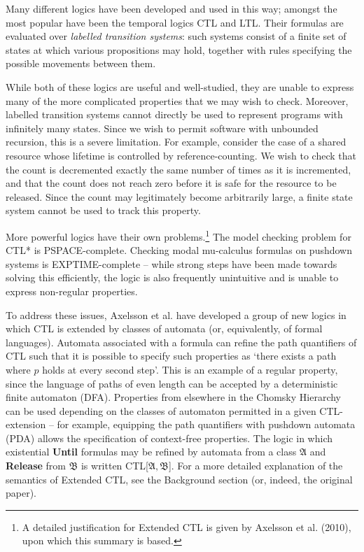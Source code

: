 \documentclass[11pt]{article}
\theoremstyle{definition}
\begin{document}
Many different logics have been developed and used in this way; amongst the
most popular have been the temporal logics CTL and LTL. Their formulas are
evaluated over \textit{labelled transition systems}: such systems consist of a
finite set of states at which various propositions may hold, together with
rules specifying the possible movements between them.

While both of these logics are useful and well-studied, they are unable to
express many of the more complicated properties that we may wish to check.
Moreover, labelled transition systems cannot directly be used to represent
programs with infinitely many states. Since we wish to permit software with
unbounded recursion, this is a severe limitation. For example, consider the
case of a shared resource whose lifetime is controlled by reference-counting.
We wish to check that the count is decremented exactly the same number of times
as it is incremented, and that the count does not reach zero before it is safe
for the resource to be released. Since the count may legitimately become
arbitrarily large, a finite state system cannot be used to track this property.


More powerful logics have their own problems.\footnote{A detailed justification
for Extended CTL is given by Axelsson et al. (2010), upon which this summary is
based.} The model checking problem for CTL* is
PSPACE-complete\cite{Kreutzer10}\cite{sistla1985complexity}.  Checking modal
mu-calculus formulas on pushdown systems is
EXPTIME-complete\cite{walukiewicz1996pushdown} -- while strong steps have been
made towards solving this efficiently\cite{hague2010analysing}, the logic is
also frequently unintuitive and is unable to express non-regular properties.

To address these issues, Axelsson et al. have developed a group of new logics
in which CTL is extended by classes of automata (or, equivalently, of formal
languages).\cite{Kreutzer10} Automata associated with a formula can refine the path quantifiers
of CTL such that it is possible to specify such properties as `there exists a
path where $p$ holds at every second step'. This is an example of a regular
property, since the language of paths of even length can be accepted by a
deterministic finite automaton (DFA). Properties from elsewhere in the Chomsky
Hierarchy can be used depending on the classes of automaton permitted in a
given CTL-extension -- for example, equipping the path quantifiers with
pushdown automata (PDA) allows the specification of context-free properties.
The logic in which existential \textbf{Until} formulas may be refined by
automata from a class $\mathfrak{A}$ and \textbf{Release} from $\mathfrak{B}$ is
written CTL[$\mathfrak{A}, \mathfrak{B}$]. For a more detailed explanation of the
semantics of Extended CTL, see the Background section (or, indeed, the original
paper\cite{Kreutzer10}).
\end{document}
